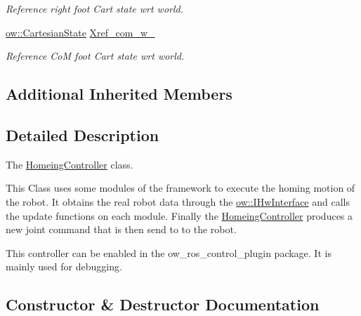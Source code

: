 \begin{DoxyCompactItemize}
\begin{DoxyCompactList}\small\item\em Reference right foot Cart state wrt world. \end{DoxyCompactList}\item 
\hyperlink{classow__core_1_1CartesianState}{ow\+::\+Cartesian\+State} \hyperlink{classow__controller_1_1HomeingController_ac48d8776f0a2c8060bf186bf343860d2}{Xref\+\_\+com\+\_\+w\+\_\+}\hypertarget{classow__controller_1_1HomeingController_ac48d8776f0a2c8060bf186bf343860d2}{}\label{classow__controller_1_1HomeingController_ac48d8776f0a2c8060bf186bf343860d2}

\begin{DoxyCompactList}\small\item\em Reference CoM foot Cart state wrt world. \end{DoxyCompactList}\end{DoxyCompactItemize}
\subsection*{Additional Inherited Members}


\subsection{Detailed Description}
The \hyperlink{classow__controller_1_1HomeingController}{Homeing\+Controller} class. 

This Class uses some modules of the framework to execute the homing motion of the robot. It obtains the real robot data through the \hyperlink{classow_1_1IHwInterface}{ow\+::\+I\+Hw\+Interface} and calls the update functions on each module. Finally the \hyperlink{classow__controller_1_1HomeingController}{Homeing\+Controller} produces a new joint command that is then send to to the robot.

This controller can be enabled in the ow\+\_\+ros\+\_\+control\+\_\+plugin package. It is mainly used for debugging. 

\subsection{Constructor \& Destructor Documentation}
